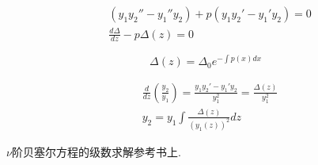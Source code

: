 $$
\begin{aligned}
& \left(y_1 y_2''-y_1'' 
y_2\right)+p\left(y_1 y_2'-y_1' y_2\right) = 0\\
& \frac{d \Delta}{d z} - p \Delta(z)=0
\end{aligned}
$$

$$
\Delta(z)=\Delta_0 e^{-\int p(x) d x}
$$

$$
\begin{aligned}
& \frac{d}{d z}\left(\frac{y_{2}}{y_1}\right)=\frac{y_{1} y_{2}'-y_{1}' y_{2}}{y_{1}^2}=\frac{\Delta(z)}{y_{1}^2} \\
& y_{2}=y_{1} \int \frac{\Delta(z)}{\left(y_{1}(z)\right)^2} d z
\end{aligned}
$$

$\nu$阶贝塞尔方程的级数求解参考书上.